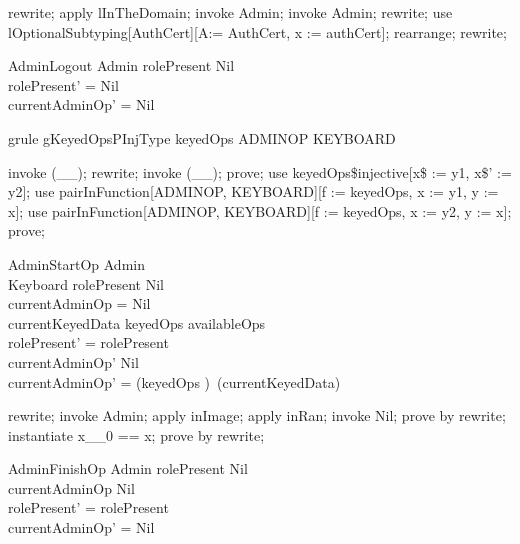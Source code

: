 \begin{zproof}
rewrite;
apply lInTheDomain;
invoke \Delta Admin;
invoke Admin;
rewrite;
use lOptionalSubtyping[AuthCert][A:= AuthCert, x := authCert];
rearrange;
rewrite;
\end{zproof}

\begin{schema}{AdminLogout}
  \Delta Admin
\where
  rolePresent \neq  Nil\\
  rolePresent' = Nil\\
  currentAdminOp' = Nil
\end{schema}

\begin{theorem}{grule gKeyedOpsPInjType}
keyedOps \in  ADMINOP \pinj  KEYBOARD
\end{theorem}

\begin{zproof}[gKeyedOpsPInjType]
invoke (\_\pinj \_);
rewrite;
invoke (\_\pfun \_);
prove;
use keyedOps\$injective[x\$ := y1, x\$' := y2];
use pairInFunction[ADMINOP, KEYBOARD][f := keyedOps, x := y1, y := x];
use pairInFunction[ADMINOP, KEYBOARD][f := keyedOps, x := y2, y := x];
prove;
\end{zproof}

\begin{schema}{AdminStartOp}
  \Delta Admin\\
  Keyboard
\where
  rolePresent \neq  Nil\\
  currentAdminOp = Nil\\
  currentKeyedData \in  keyedOps \limg  availableOps \rimg \\
  rolePresent' = rolePresent\\
  currentAdminOp' \neq Nil \\
  \The currentAdminOp' = (keyedOps \inv)~(currentKeyedData)
\end{schema}

\begin{zproof}
rewrite;
invoke \Delta Admin;
apply inImage;
apply inRan;
invoke Nil;
prove by rewrite;
instantiate x\_\_0 == x;
prove by rewrite;
\end{zproof}

\begin{schema}{AdminFinishOp}
  \Delta Admin
\where
  rolePresent \neq  Nil\\
  currentAdminOp \neq  Nil\\
  rolePresent' = rolePresent\\
  currentAdminOp' = Nil
\end{schema}

